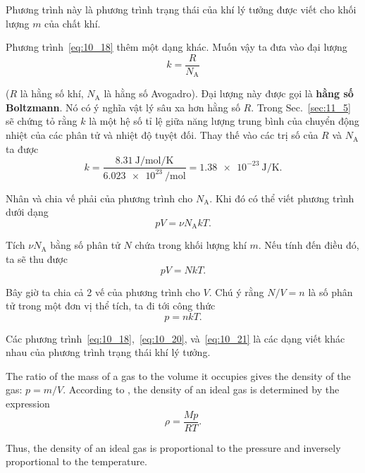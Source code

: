 \noindent
Phương trình này là phương trình trạng thái của khí lý tưởng được viết cho khối lượng $m$ của chất khí.

Phương trình~\eqref{eq:10_18} thêm một dạng khác. Muốn vậy ta đưa vào đại lượng
\begin{equation}\label{eq:10_19}
	k = \frac{R}{N_{\text{A}}}
\end{equation}

\noindent
($R$ là hằng số khí, $N_{\text{A}}$ là hằng số Avogadro). Đại lượng này được gọi là \textbf{hằng số Boltzmann}. Nó có ý nghĩa vật lý sâu xa hơn hằng số $R$. Trong Sec.~\ref{sec:11_5} sẽ chứng tỏ rằng $k$ là một hệ số tỉ lệ giữa năng lượng trung bình của chuyển động nhiệt của các phân tử và nhiệt độ tuyệt đối. Thay thế vào  các trị số của $R$ và $N_{\text{A}}$ ta được
\begin{equation*}
	k = \frac{\SI{8.31}{\joule\per\mole\per\kelvin}}{\SI{6.023e23}{\per\mole}} = \SI{1.38e-23}{\joule\per\kelvin}.
\end{equation*}

Nhân và chia vế phải của phương trình  cho $N_{\text{A}}$. Khi đó có thể viết phương trình dưới dạng
\begin{equation*}
	pV = \nu N_{\text{A}} k T.
\end{equation*}

\noindent
Tích $\nu N_{\text{A}}$ bằng số phân tử $N$ chứa trong khối lượng khí $m$. Nếu tính đến điều đó, ta sẽ thu được
\begin{equation}\label{eq:10_20}
	pV = NkT.
\end{equation}

Bây giờ ta chia cả 2 vế của phương trình  cho $V$. Chú ý rằng $N/V=n$ là số phân tử trong một đơn vị thể tích, ta đi tới công thức
\begin{equation}\label{eq:10_21}
	p = nkT.
\end{equation}

Các phương trình~\eqref{eq:10_18},~\eqref{eq:10_20}, và~\eqref{eq:10_21} là các dạng viết khác nhau của phương trình trạng thái khí lý tưởng.

The ratio of the mass of a gas to the volume it occupies gives the density of the gas: $p = m/V$. According to , the density of an ideal gas is determined by the expression
\begin{equation}\label{eq:10_22}
	\rho = \frac{M p}{R T}.
\end{equation}

\noindent
Thus, the density of an ideal gas is proportional to the pressure and inversely proportional to the temperature.

